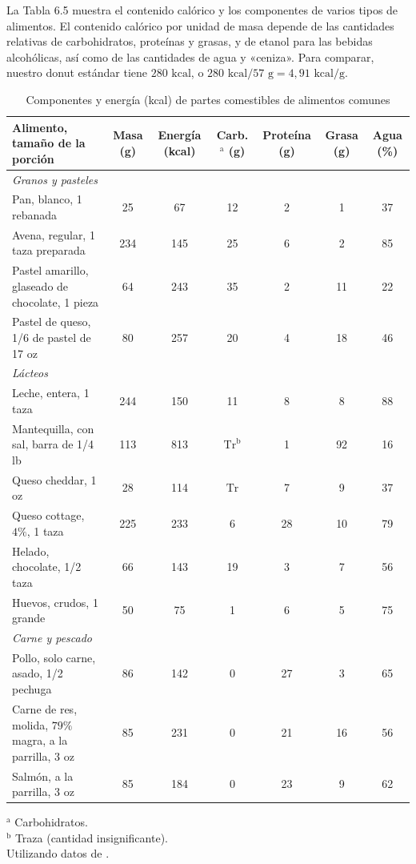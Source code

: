 \documentclass[12pt]{book}
\begin{document}
La Tabla 6.5 muestra el contenido calórico y los componentes de varios tipos de alimentos. El contenido calórico por unidad de masa depende de las cantidades relativas de carbohidratos, proteínas y grasas, y de etanol para las bebidas alcohólicas, así como de las cantidades de agua y «ceniza». Para comparar, nuestro donut estándar tiene $280\text{ kcal}$, o $280\text{ kcal}/57\text{ g} = 4,91\text{ kcal/g}$.

\begin{table}[htbp]
\centering
\caption{Componentes y energía (kcal) de partes comestibles de alimentos comunes}
\label{tab:65}
\small
\begin{tabularx}{\textwidth}{Xcccccc}
\toprule
\textbf{Alimento, tamaño de la porción} & \textbf{Masa (g)} & \textbf{Energía (kcal)} & \textbf{Carb.$^{\text{a}}$ (g)} & \textbf{Proteína (g)} & \textbf{Grasa (g)} & \textbf{Agua (\%)} \\
\midrule
\multicolumn{7}{l}{\textit{Granos y pasteles}} \\
Pan, blanco, 1 rebanada & 25 & 67 & 12 & 2 & 1 & 37 \\
Avena, regular, 1 taza preparada & 234 & 145 & 25 & 6 & 2 & 85 \\
Pastel amarillo, glaseado de chocolate, 1 pieza & 64 & 243 & 35 & 2 & 11 & 22 \\
Pastel de queso, 1/6 de pastel de 17 oz & 80 & 257 & 20 & 4 & 18 & 46 \\
\midrule
\multicolumn{7}{l}{\textit{Lácteos}} \\
Leche, entera, 1 taza & 244 & 150 & 11 & 8 & 8 & 88 \\
Mantequilla, con sal, barra de 1/4 lb & 113 & 813 & $\text{Tr}^{\text{b}}$ & 1 & 92 & 16 \\
Queso cheddar, 1 oz & 28 & 114 & $\text{Tr}$ & 7 & 9 & 37 \\
Queso cottage, $4\%$, 1 taza & 225 & 233 & 6 & 28 & 10 & 79 \\
Helado, chocolate, 1/2 taza & 66 & 143 & 19 & 3 & 7 & 56 \\
Huevos, crudos, 1 grande & 50 & 75 & 1 & 6 & 5 & 75 \\
\midrule
\multicolumn{7}{l}{\textit{Carne y pescado}} \\
Pollo, solo carne, asado, 1/2 pechuga & 86 & 142 & 0 & 27 & 3 & 65 \\
Carne de res, molida, $79\%$ magra, a la parrilla, 3 oz & 85 & 231 & 0 & 21 & 16 & 56 \\
Salmón, a la parrilla, 3 oz & 85 & 184 & 0 & 23 & 9 & 62 \\
\bottomrule
\end{tabularx}
\begin{flushleft}
    $^{\text{a}}$ Carbohidratos.\\
    $^{\text{b}}$ Traza (cantidad insignificante).\\
    Utilizando datos de \cite{41}.
\end{flushleft}
\end{table}
\end{document}
